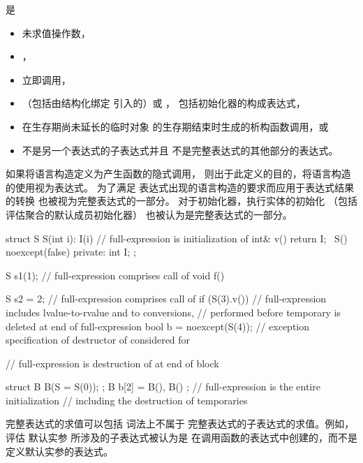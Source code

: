 \pnum
{} 是
\begin{itemize}
\item
未求值操作数，
\item
{}，
\item
立即调用，
\item
{}
（包括由结构化绑定 引入的）或
，
包括初始化器的构成表达式，
\item
在生存期尚未延长的临时对象
的生存期结束时生成的析构函数调用，或
\item
不是另一个表达式的子表达式并且
不是完整表达式的其他部分的表达式。
\end{itemize}
如果将语言构造定义为产生函数的隐式调用，
则出于此定义的目的，将语言构造的使用视为表达式。
为了满足
表达式出现的语言构造的要求而应用于表达式结果的转换
也被视为完整表达式的一部分。
对于初始化器，执行实体的初始化
（包括评估聚合的默认成员初始化器）
也被认为是完整表达式的一部分。
\begin{example}
\begin{codeblock}
struct S {
  S(int i): I(i) { }            // full-expression is initialization of 
  int& v() { return I; }
  ~S() noexcept(false) { }
private:
  int I;
};

S s1(1);                        // full-expression comprises call of 
void f() {
  S s2 = 2;                     // full-expression comprises call of 
  if (S(3).v())                 // full-expression includes lvalue-to-rvalue and  to  conversions,
                                // performed before temporary is deleted at end of full-expression
  { }
  bool b = noexcept(S(4));      // exception specification of destructor of  considered for 

  // full-expression is destruction of  at end of block
}
struct B {
  B(S = S(0));
};
B b[2] = { B(), B() };          // full-expression is the entire initialization
                                // including the destruction of temporaries
\end{codeblock}
\end{example}

\pnum
\begin{note}
完整表达式的求值可以包括
词法上不属于
完整表达式的子表达式的求值。例如，评估
默认实参 所涉及的子表达式被认为是
在调用函数的表达式中创建的，而不是
定义默认实参的表达式。
\end{note}

